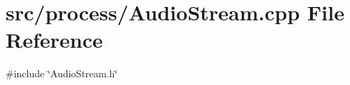 \section{src/process/\+Audio\+Stream.cpp File Reference}
\label{_audio_stream_8cpp}
{\ttfamily \#include \char`\"{}Audio\+Stream.\+h\char`\"{}}\newline
